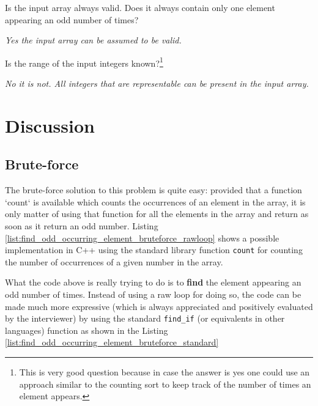 \begin{QandA}
	\item Is the input array always valid. Does it always contain only one element appearing an odd number of times?
	\begin{answered}
		\textit{Yes the input array can be assumed to be valid.}
	\end{answered}
	\item  Is the range of the input integers known?\footnote{ This is very good question because in case the answer is yes one could use an approach similar to the counting sort to keep track of the number of times an element appears.}
	\begin{answered}
		\textit{No it is not. All integers that are representable can be present in the input array.}
	\end{answered}
	
\end{QandA}

\section{Discussion}

\subsection{Brute-force}
\label{find_odd_occurring_element:sec:bruteforce}
The brute-force solution to this problem is quite easy: provided that a function `count` is available which counts the occurrences of an element in the array, it is only matter of using that function for all the elements in the array and return as soon as it return an odd number. 
 Listing \ref{list:find_odd_occurring_element_bruteforce_rawloop} shows a possible implementation in C++ using the standard library function \texttt{count} for counting the number of occurrences of a given number in the array.



What the code above is really trying to do is to \textbf{find} the element appearing an odd number of times. Instead of using a raw loop for doing so, the code can be made much more expressive (which is always appreciated and positively evaluated by the interviewer) by using the standard \texttt{find\_if} (or equivalents in other languages) function as shown in the Listing \ref{list:find_odd_occurring_element_bruteforce_standard} 

